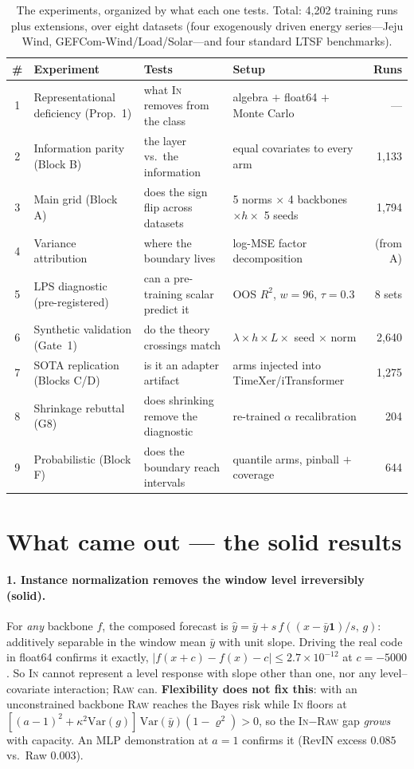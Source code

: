 \documentclass{article}
\newcommand{\lps}{\ensuremath{\mathrm{LPS}}}
\newcommand{\var}{\ensuremath{\mathrm{Var}}}
\newcommand{\rawm}{\textsc{Raw}}
\newcommand{\inm}{\textsc{In}}
\newcommand{\good}{\textcolor{green!55!black}{\textbf{solid}}}
\begin{document}
\begin{table}[h]
\centering\small
\setlength{\tabcolsep}{4pt}
\caption{The experiments, organized by what each one tests. Total: 4{,}202
training runs plus extensions, over eight datasets (four exogenously driven
energy series---Jeju Wind, GEFCom-Wind/Load/Solar---and four standard LTSF
benchmarks).}
\begin{tabular}{clll r}
\toprule
\# & Experiment & Tests & Setup & Runs \\
\midrule
1 & Representational deficiency (Prop.\ 1) & what \inm{} removes from the class & algebra $+$ float64 $+$ Monte Carlo & --- \\
2 & Information parity (Block B) & the layer vs.\ the information & equal covariates to every arm & 1{,}133 \\
3 & Main grid (Block A) & does the sign flip across datasets & 5 norms $\times$ 4 backbones $\times h \times$ 5 seeds & 1{,}794 \\
4 & Variance attribution & where the boundary lives & log-MSE factor decomposition & (from A) \\
5 & \lps{} diagnostic (pre-registered) & can a pre-training scalar predict it & OOS $R^2$, $w{=}96$, $\tau{=}0.3$ & 8 sets \\
6 & Synthetic validation (Gate~1) & do the theory crossings match & $\lambda\times h\times L\times$ seed $\times$ norm & 2{,}640 \\
7 & SOTA replication (Blocks C/D) & is it an adapter artifact & arms injected into TimeXer/iTransformer & 1{,}275 \\
8 & Shrinkage rebuttal (G8) & does shrinking remove the diagnostic & re-trained $\alpha$ recalibration & 204 \\
9 & Probabilistic (Block F) & does the boundary reach intervals & quantile arms, pinball $+$ coverage & 644 \\
\bottomrule
\end{tabular}
\end{table}

\section{What came out --- the solid results}

\paragraph{1. Instance normalization removes the window level irreversibly (\good).}
For \emph{any} backbone $f$, the composed forecast is
$\hat y = \bar y + s\,f\!\left((x-\bar y\mathbf 1)/s,\, g\right)$: additively
separable in the window mean $\bar y$ with unit slope. Driving the real code in
float64 confirms it exactly, $\lvert f(x+c)-f(x)-c\rvert \le 2.7\times10^{-12}$
at $c=-5000$. So \inm{} cannot represent a level response with slope other than
one, nor any level--covariate interaction; \rawm{} can. \textbf{Flexibility does
not fix this}: with an unconstrained backbone \rawm{} reaches the Bayes risk
while \inm{} floors at $[(a-1)^2+\kappa^2\var(g)]\,\var(\bar y)(1-\varrho^2)>0$,
so the \inm{}$-$\rawm{} gap \emph{grows} with capacity. An MLP demonstration at
$a{=}1$ confirms it (RevIN excess $0.085$ vs.\ Raw $0.003$).
\end{document}
